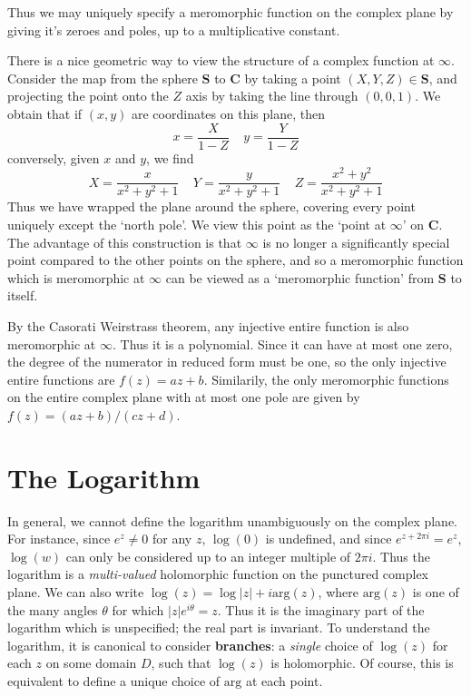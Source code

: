 Thus we may uniquely specify a meromorphic function on the complex plane by giving it's zeroes and poles, up to a multiplicative constant.

There is a nice geometric way to view the structure of a complex function at $\infty$. Consider the map from the sphere $\mathbf{S}$ to $\mathbf{C}$ by taking a point $(X,Y,Z) \in \mathbf{S}$, and projecting the point onto the $Z$ axis by taking the line through $(0,0,1)$. We obtain that if $(x,y)$ are coordinates on this plane, then
%
\[ x = \frac{X}{1 - Z}\ \ \ \ \ y = \frac{Y}{1 - Z} \]
%
conversely, given $x$ and $y$, we find
%
\[ X = \frac{x}{x^2 + y^2 + 1}\ \ \ \ \ Y = \frac{y}{x^2 + y^2 + 1}\ \ \ \ \ Z = \frac{x^2 + y^2}{x^2 + y^2 + 1} \]
%
Thus we have wrapped the plane around the sphere, covering every point uniquely except the `north pole'. We view this point as the `point at $\infty$' on $\mathbf{C}$. The advantage of this construction is that $\infty$ is no longer a significantly special point compared to the other points on the sphere, and so a meromorphic function which is meromorphic at $\infty$ can be viewed as a `meromorphic function' from $\mathbf{S}$ to itself.

By the Casorati Weirstrass theorem, any injective entire function is also meromorphic at $\infty$. Thus it is a polynomial. Since it can have at most one zero, the degree of the numerator in reduced form must be one, so the only injective entire functions are $f(z) = az + b$. Similarily, the only meromorphic functions on the entire complex plane with at most one pole are given by $f(z) = (az + b)/(cz + d)$.

\section{The Logarithm}

In general, we cannot define the logarithm unambiguously on the complex plane. For instance, since $e^z \neq 0$ for any $z$, $\log(0)$ is undefined, and since $e^{z + 2 \pi i} = e^z$, $\log(w)$ can only be considered up to an integer multiple of $2 \pi i$. Thus the logarithm is a {\it multi-valued} holomorphic function on the punctured complex plane. We can also write $\log(z) = \log |z| + i \text{arg}(z)$, where $\text{arg}(z)$ is one of the many angles $\theta$ for which $|z| e^{i \theta} = z$. Thus it is the imaginary part of the logarithm which is unspecified; the real part is invariant. To understand the logarithm, it is canonical to consider {\bf branches}: a {\it single} choice of $\log(z)$ for each $z$ on some domain $D$, such that $\log(z)$ is holomorphic. Of course, this is equivalent to define a unique choice of $\text{arg}$ at each point.

